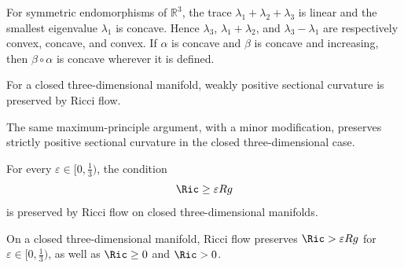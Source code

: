 \begin{lemma}
\label{topping-ch9-eigenvalue-convexity}
For symmetric endomorphisms of \(\mathbb R^3\), the trace
\(\lambda_1+\lambda_2+\lambda_3\) is linear and the smallest eigenvalue
\(\lambda_1\) is concave. Hence \(\lambda_3\),
\(\lambda_1+\lambda_2\), and \(\lambda_3-\lambda_1\) are respectively
convex, concave, and convex. If \(\alpha\) is concave and \(\beta\) is
concave and increasing, then \(\beta\circ\alpha\) is concave wherever it is
defined.
\end{lemma}

\begin{theorem}
\label{topping-ch9-positive-sectional-preserved}

For a closed three-dimensional manifold, weakly positive sectional curvature
is preserved by Ricci flow.
\end{theorem}

\begin{remark}
\label{topping-ch9-positive-sectional-strong}
The same maximum-principle argument, with a minor modification, preserves
strictly positive sectional curvature in the closed three-dimensional case.
\end{remark}

\begin{theorem}
\label{topping-ch9-ricci-pinching-preserved}

For every \(\varepsilon\in[0,\tfrac13)\), the condition
\[
\Ric\ge\varepsilon Rg
\]
is preserved by Ricci flow on closed three-dimensional manifolds.
\end{theorem}

\begin{corollary}
\label{topping-ch9-ricci-positive-preserved}

On a closed three-dimensional manifold, Ricci flow preserves
\(\Ric>\varepsilon Rg\) for \(\varepsilon\in[0,\tfrac13)\), as well as
\(\Ric\ge0\) and \(\Ric>0\).
\end{corollary}

